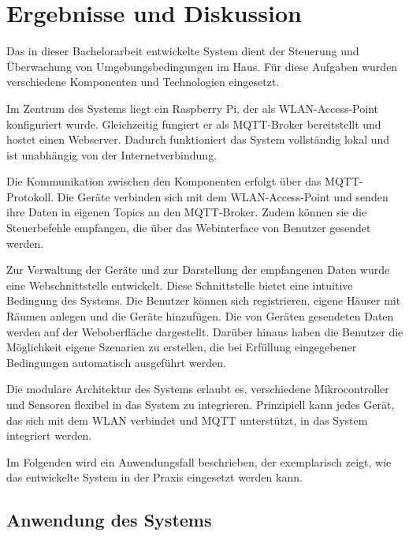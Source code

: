 \documentclass[12pt, letterpaper]{article}
\begin{document}
\newpage
\section{Ergebnisse und Diskussion}
\par Das in dieser Bachelorarbeit entwickelte System dient der Steuerung und Überwachung von Umgebungsbedingungen im Haus. Für diese Aufgaben wurden verschiedene Komponenten und Technologien eingesetzt.
\par Im Zentrum des Systems liegt ein Raspberry Pi, der als WLAN-Access-Point konfiguriert wurde. Gleichzeitig fungiert er als MQTT-Broker bereitstellt und hostet einen Webserver. Dadurch funktioniert das System vollständig lokal und ist unabhängig von der Internetverbindung.
\par Die Kommunikation zwischen den Komponenten erfolgt über das MQTT-Protokoll. Die Geräte verbinden sich mit dem WLAN-Access-Point und senden ihre Daten in eigenen Topics an den MQTT-Broker. Zudem können sie die Steuerbefehle empfangen, die über das Webinterface von Benutzer gesendet werden. 
\par Zur Verwaltung der Geräte und zur Darstellung der empfangenen Daten wurde eine Webschnittstelle entwickelt. Diese Schnittstelle bietet eine intuitive Bedingung des Systems. Die Benutzer können sich registrieren, eigene Häuser mit Räumen anlegen und die Geräte hinzufügen. Die von Geräten gesendeten Daten werden auf der Weboberfläche dargestellt. Darüber hinaus haben die Benutzer die Möglichkeit eigene Szenarien zu erstellen, die bei Erfüllung eingegebener Bedingungen automatisch ausgeführt werden.
\par Die modulare Architektur des Systems erlaubt es, verschiedene Mikrocontroller und Sensoren flexibel in das System zu integrieren. Prinzipiell kann jedes Gerät, das sich mit dem WLAN verbindet und MQTT unterstützt, in das System integriert werden. 
\par Im Folgenden wird ein Anwendungsfall beschrieben, der exemplarisch zeigt, wie das entwickelte System in der Praxis eingesetzt werden kann.
\subsection{Anwendung des Systems}
\end{document}
